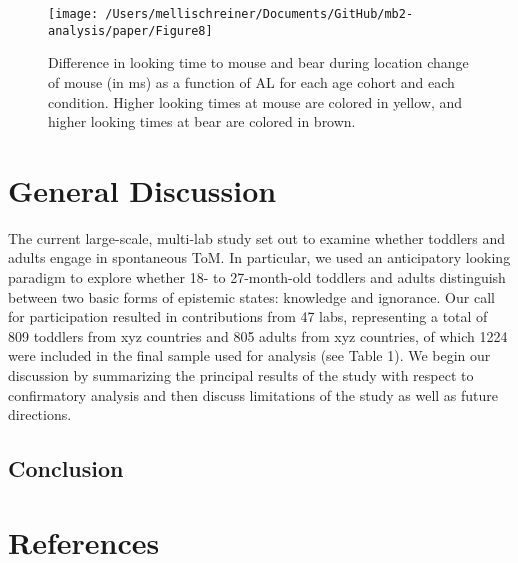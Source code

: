 \documentclass[
  english,
  man,floatsintext]{apa6}
\begin{document}
\begin{figure}

{\centering \texttt{[image: /Users/mellischreiner/Documents/GitHub/mb2-analysis/paper/Figure8]} 

}

\caption{Difference in looking time to mouse and bear during location change of mouse (in ms) as a function of AL for each age cohort and each condition. Higher looking times at mouse are colored in yellow, and higher looking times at bear are colored in brown.}\label{fig:fig10}
\end{figure}

\hypertarget{general-discussion}{%
\section{General Discussion}\label{general-discussion}}

The current large-scale, multi-lab study set out to examine whether toddlers and adults engage in spontaneous ToM. In particular, we used an anticipatory looking paradigm to explore whether 18- to 27-month-old toddlers and adults distinguish between two basic forms of epistemic states: knowledge and ignorance. Our call for participation resulted in contributions from 47 labs, representing a total of 809 toddlers from xyz countries and 805 adults from xyz countries, of which 1224 were included in the final sample used for analysis (see Table 1). We begin our discussion by summarizing the principal results of the study with respect to confirmatory analysis and then discuss limitations of the study as well as future directions.

\hypertarget{conclusion}{%
\subsection{Conclusion}\label{conclusion}}

\newpage

\hypertarget{references}{%
\section{References}\label{references}}

\begingroup
\setlength{\parindent}{-0.5in}
\setlength{\leftskip}{0.5in}
\end{document}
